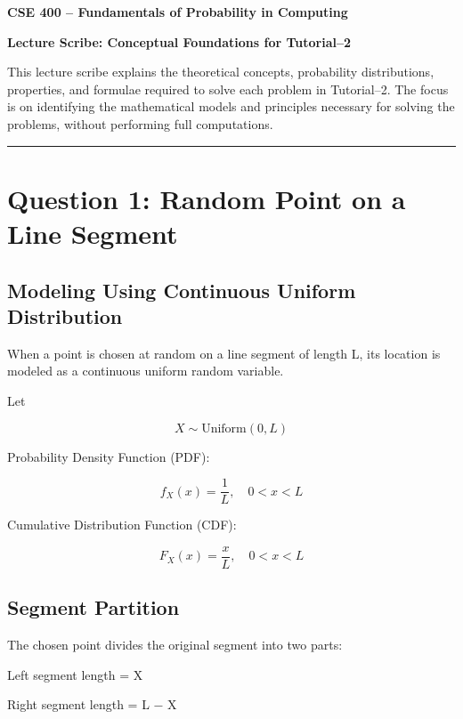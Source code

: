\documentclass[12pt]{article}
\begin{document}
\begin{center}
\textbf{\Large CSE 400 – Fundamentals of Probability in Computing}

\vspace{0.5cm}

\textbf{\large Lecture Scribe: Conceptual Foundations for Tutorial–2}
\end{center}

\vspace{0.5cm}

This lecture scribe explains the theoretical concepts, probability distributions, properties, and formulae required to solve each problem in Tutorial–2. The focus is on identifying the mathematical models and principles necessary for solving the problems, without performing full computations.

\vspace{0.5cm}

\hrule
\vspace{0.5cm}

\section*{Question 1: Random Point on a Line Segment}

\subsection*{Modeling Using Continuous Uniform Distribution}

When a point is chosen at random on a line segment of length L, its location is modeled as a continuous uniform random variable.

Let

\[
X \sim \text{Uniform}(0, L)
\]

Probability Density Function (PDF):

\[
f_X(x) = \frac{1}{L}, \quad 0 < x < L
\]

Cumulative Distribution Function (CDF):

\[
F_X(x) = \frac{x}{L}, \quad 0 < x < L
\]

\subsection*{Segment Partition}

The chosen point divides the original segment into two parts:

Left segment length = X

Right segment length = L − X
\end{document}
